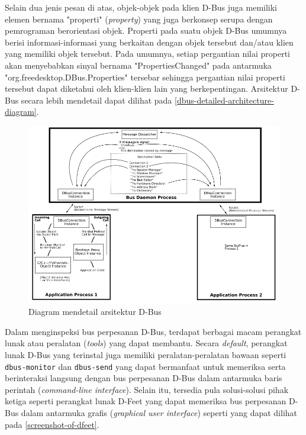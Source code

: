 Selain dua jenis pesan di atas, objek-objek pada klien D-Bus juga memiliki elemen bernama "properti" (\textit{property}) yang juga berkonsep serupa dengan pemrograman berorientasi objek. Properti pada suatu objek D-Bus umumnya berisi informasi-informasi yang berkaitan dengan objek tersebut dan/atau klien yang memiliki objek tersebut. Pada umumnya, setiap pergantian nilai properti akan menyebabkan sinyal bernama "PropertiesChanged" pada antarmuka "org.freedesktop.DBus.Properties" tersebar sehingga pergantian nilai properti tersebut dapat diketahui oleh klien-klien lain yang berkepentingan. Arsitektur D-Bus secara lebih mendetail dapat dilihat pada \autoref{dbus-detailed-architecture-diagram}.

\begin{figure}
    \centering
    \includegraphics[width=1\linewidth]{assets/dbus-diagram.png}
    \caption{Diagram mendetail arsitektur D-Bus \cite{dbus-main-project-page}}
    \label{dbus-detailed-architecture-diagram}
\end{figure}

Dalam menginspeksi bus perpesanan D-Bus, terdapat berbagai macam perangkat lunak atau peralatan (\textit{tools}) yang dapat membantu. Secara \textit{default}, perangkat lunak D-Bus yang terinstal juga memiliki peralatan-peralatan bawaan seperti \verb|dbus-monitor| dan \verb|dbus-send| yang dapat bermanfaat untuk memeriksa serta berinteraksi langsung dengan bus perpesanan D-Bus dalam antarmuka baris perintah (\textit{command-line interface}). Selain itu, tersedia pula solusi-solusi pihak ketiga seperti perangkat lunak D-Feet yang dapat memeriksa bus perpesanan D-Bus dalam antarmuka grafis (\textit{graphical user interface}) seperti yang dapat dilihat pada \autoref{screenshot-of-dfeet}.

